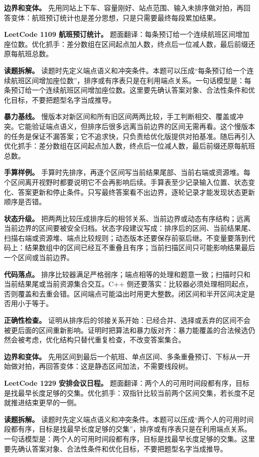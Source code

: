 \textbf{边界和变体。} 先用同站上下车、容量刚好、站点范围、输入未排序做对拍，再回答变体：航班预订统计也是差分思想，只是只需要最终每段累加结果。

\noindent\textbf{LeetCode 1109 航班预订统计。} 题面翻译：每条预订给一个连续航班区间增加座位数。优化抓手：差分数组在区间起点加人数，终点后一位减人数，最后前缀还原每航班总数。

\textbf{读题拆解。} 读题时先定义端点语义和冲突条件。本题可以压成“每条预订给一个连续航班区间增加座位数”，排序或有序表只是在利用端点关系。一句话模型是：每条预订给一个连续航班区间增加座位数。这里要先确认答案对象、合法性条件和优化目标，不要把题型名字当成推导。

\textbf{暴力基线。} 慢版本对新区间和所有旧区间两两比较，手工判断相交、覆盖或冲突。它能验证端点语义，但排序后很多远离当前边界的区间无需再看。这个慢版本的任务是保证不漏答案；它不追求快，只负责给优化版提供对拍基准。随后再引入优化抓手：差分数组在区间起点加人数，终点后一位减人数，最后前缀还原每航班总数。

\textbf{手算样例。} 手算时先排序，再逐个区间写当前结果尾部、当前右端或资源堆。每个区间离开视野时都要说明它不会再影响后续。手算表至少记录输入位置、状态变化、答案更新和停止条件。只写最终答案看不出边界，逐轮记录才能发现状态更新顺序是否错。

\textbf{状态升级。} 把两两比较压成排序后的相邻关系、当前边界或动态有序结构；远离当前边界的区间要被安全归档。状态字段建议写成：排序后的区间、当前结果尾、扫描右端或资源堆、端点比较规则；动态版本还要保存前驱后继。不变量要落到代码上：结果数组中的区间已经互不重叠且有序；当前扫描区间只可能影响结果最后一个区间或当前边界。

\textbf{代码落点。} 排序比较器满足严格弱序；端点相等的处理和题意一致；扫描时只和当前结果尾或当前资源集合交互。C++ 侧还要落实：比较器必须处理相同起点，否则覆盖和去重会错。区间端点可能溢出时用更大整数。闭区间和半开区间决定是否用小于等于。

\textbf{正确性检查。} 证明从排序后的邻接关系开始：已经合并、选择或丢弃的区间不会被更后面的区间重新影响。证明时把算法和暴力版对齐：暴力能覆盖的合法候选仍然会被考虑，优化结构只替代重复检查，不改变答案集合。

\textbf{边界和变体。} 先用区间到最后一个航班、单点区间、多条重叠预订、下标从一开始做对拍，再回答变体：这是静态区间加法，不需要线段树。

\noindent\textbf{LeetCode 1229 安排会议日程。} 题面翻译：两个人的可用时间段都有序，目标是找最早长度足够的交集。优化抓手：双指针比较当前两个区间交集，若长度不足就推进结束更早的一侧。

\textbf{读题拆解。} 读题时先定义端点语义和冲突条件。本题可以压成“两个人的可用时间段都有序，目标是找最早长度足够的交集”，排序或有序表只是在利用端点关系。一句话模型是：两个人的可用时间段都有序，目标是找最早长度足够的交集。这里要先确认答案对象、合法性条件和优化目标，不要把题型名字当成推导。

